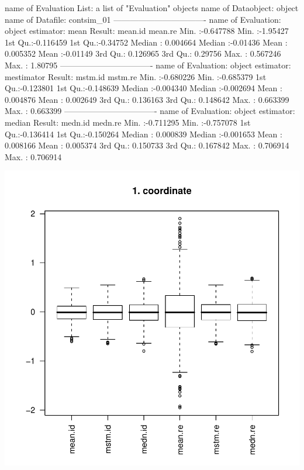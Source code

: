 \documentclass[11pt]{article}
\begin{document}
\begin{Schunk}
\begin{Soutput}
name of Evaluation List: a list of "Evaluation" objects
name of Dataobject: object
name of Datafile: contsim_01
----------------------------------
name of Evaluation: object
estimator: mean
Result:
    mean.id             mean.re        
 Min.   :-0.647788   Min.   :-1.95427  
 1st Qu.:-0.116459   1st Qu.:-0.34752  
 Median : 0.004664   Median :-0.01436  
 Mean   : 0.005352   Mean   :-0.01149  
 3rd Qu.: 0.126965   3rd Qu.: 0.29756  
 Max.   : 0.567246   Max.   : 1.80795  
----------------------------------
name of Evaluation: object
estimator: mestimator
Result:
    mstm.id             mstm.re         
 Min.   :-0.680226   Min.   :-0.685379  
 1st Qu.:-0.123801   1st Qu.:-0.148639  
 Median :-0.004340   Median :-0.002694  
 Mean   : 0.004876   Mean   : 0.002649  
 3rd Qu.: 0.136163   3rd Qu.: 0.148642  
 Max.   : 0.663399   Max.   : 0.663399  
----------------------------------
name of Evaluation: object
estimator: median
Result:
    medn.id             medn.re         
 Min.   :-0.711295   Min.   :-0.757078  
 1st Qu.:-0.136414   1st Qu.:-0.150264  
 Median : 0.000839   Median :-0.001653  
 Mean   : 0.008166   Mean   : 0.005374  
 3rd Qu.: 0.150733   3rd Qu.: 0.167842  
 Max.   : 0.706914   Max.   : 0.706914  
\end{Soutput}
\end{Schunk}
\includegraphics{distr-elist}
\par
\end{document}
